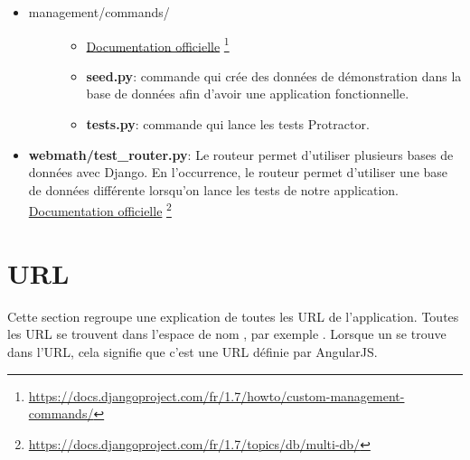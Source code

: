 \documentclass[letterpaper,10pt,oneside]{sphinxmanual}
\begin{document}
\begin{itemize}
\item {} \begin{description}
\item[{management/commands/}] \leavevmode\begin{itemize}
\item {} 
\href{https://docs.djangoproject.com/fr/1.7/howto/custom-management-commands/}{Documentation officielle} \footnote{
\href{https://docs.djangoproject.com/fr/1.7/howto/custom-management-commands/}{https://docs.djangoproject.com/fr/1.7/howto/custom-management-commands/}
}

\item {} 
\textbf{seed.py}: commande qui crée des données de démonstration dans la base de données afin d'avoir une application fonctionnelle.

\item {} 
\textbf{tests.py}: commande qui lance les tests Protractor.

\end{itemize}

\end{description}

\item {} 
\textbf{webmath/test\_router.py}: Le routeur permet d'utiliser plusieurs bases de données avec Django. En l'occurrence, le routeur permet d'utiliser une base de données différente lorsqu'on lance les tests de notre application. \href{https://docs.djangoproject.com/fr/1.7/topics/db/multi-db/}{Documentation officielle} \footnote{
\href{https://docs.djangoproject.com/fr/1.7/topics/db/multi-db/}{https://docs.djangoproject.com/fr/1.7/topics/db/multi-db/}
}

\end{itemize}


\section{URL}
\label{guide:url}
Cette section regroupe une explication de toutes les URL de l'application. Toutes les URL se trouvent dans l'espace de nom , par exemple . Lorsque un \code{\#} se trouve dans l'URL, cela signifie que c'est une URL définie par AngularJS.
\end{document}
